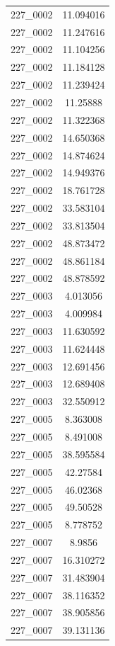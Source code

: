 \begin{table}[H]
\begin{tabular}{|c|c|}
        227\_0002 & 11.094016 \\
        227\_0002 & 11.247616 \\
        227\_0002 & 11.104256 \\
        227\_0002 & 11.184128 \\
        227\_0002 & 11.239424 \\
        227\_0002 & 11.25888 \\
        227\_0002 & 11.322368 \\
        227\_0002 & 14.650368 \\
        227\_0002 & 14.874624 \\
        227\_0002 & 14.949376 \\
        227\_0002 & 18.761728 \\
        227\_0002 & 33.583104 \\
        227\_0002 & 33.813504 \\
        227\_0002 & 48.873472 \\
        227\_0002 & 48.861184 \\
        227\_0002 & 48.878592 \\
        227\_0003 & 4.013056 \\
        227\_0003 & 4.009984 \\
        227\_0003 & 11.630592 \\
        227\_0003 & 11.624448 \\
        227\_0003 & 12.691456 \\
        227\_0003 & 12.689408 \\
        227\_0003 & 32.550912 \\
        227\_0005 & 8.363008 \\
        227\_0005 & 8.491008 \\
        227\_0005 & 38.595584 \\
        227\_0005 & 42.27584 \\
        227\_0005 & 46.02368 \\
        227\_0005 & 49.50528 \\
        227\_0005 & 8.778752 \\
        227\_0007 & 8.9856 \\
        227\_0007 & 16.310272 \\
        227\_0007 & 31.483904 \\
        227\_0007 & 38.116352 \\
        227\_0007 & 38.905856 \\
        227\_0007 & 39.131136 \\

\end{tabular}
\end{table}
